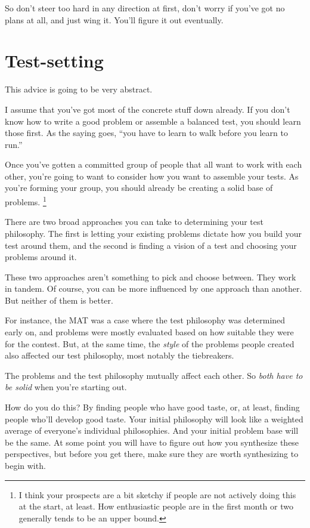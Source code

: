 \documentclass[points=false]{bounce}
\begin{document}
So don't steer too hard in any direction at first,
don't worry if you've got no plans at all,
and just wing it. You'll figure it out eventually.

\section{Test-setting}

This advice is going to be very abstract.

I assume that you've got
most of the concrete stuff down already.
If you don't know how to write a good problem
or assemble a balanced test,
you should learn those first.
As the saying goes,
``you have to learn to walk
before you learn to run.''

Once you've gotten a committed group of people that all want to work with each other,
you're going to want to consider how you want to assemble your tests.
As you're forming your group, you should already be creating a solid base of problems.
\footnote{I think your prospects are a bit sketchy
if people are not actively doing this at the start, at least.
How enthusiastic people are in the first month or two
generally tends to be an upper bound.}

There are two broad approaches
you can take to determining
your test philosophy.
The first is letting your
existing problems dictate
how you build your test around them,
and the second is finding
a vision of a test and
choosing your problems around it.

These two approaches aren't
something to pick and choose between.
They work in tandem.
Of course, you can be more
influenced by one approach than another.
But neither of them is better.

For instance,
the MAT was a case where
the test philosophy was determined early on,
and problems were mostly evaluated based on
how suitable they were for the contest.
But, at the same time,
the \emph{style} of the problems
people created also affected
our test philosophy,
most notably the tiebreakers.

The problems and the test philosophy
mutually affect each other. So
\emph{both have to be solid}
when you're starting out.

How do you do this?
By finding people who have good taste,
or, at least, finding people who'll
develop good taste.
Your initial philosophy will look like
a weighted average of everyone's individual philosophies.
And your initial problem base will be the same.
At some point you will have to figure out
how you synthesize these perspectives,
but before you get there, make sure
they are worth synthesizing to begin with.
\end{document}
